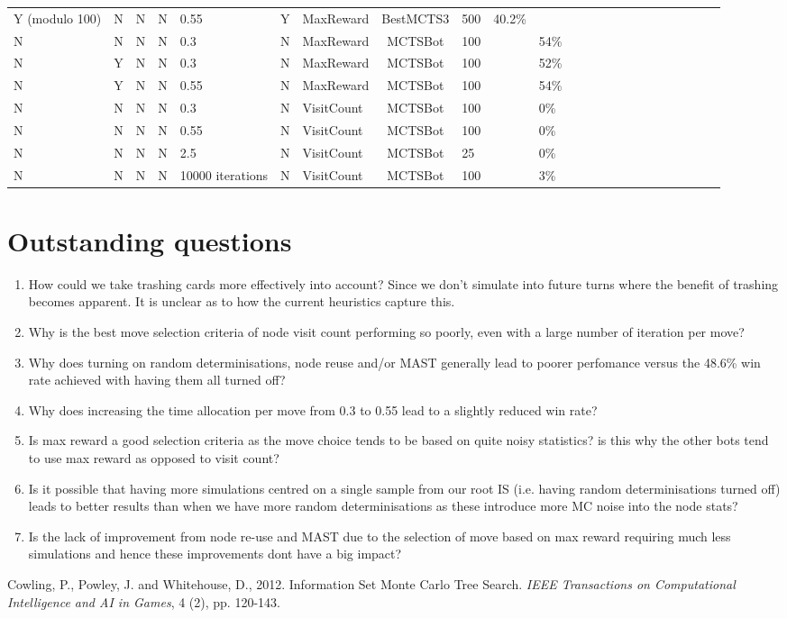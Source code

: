 \documentclass[a4paper,10pt]{article}
\begin{document}
\begin{table}[H]
{\begin{tabular}{lclclclclclclclclclclcl}
Y (modulo 100) & N & N & N & 0.55 & Y & MaxReward & BestMCTS3 & 500 & 40.2\% &  &  \\
N & N & N & N & 0.3 & N & MaxReward & MCTSBot & 100 &  & 54\% &  \\
N & Y & N & N & 0.3 & N & MaxReward & MCTSBot & 100 &  & 52\% &  \\
N & Y & N & N & 0.55 & N & MaxReward & MCTSBot & 100 &  & 54\% &  \\
N & N & N & N & 0.3 & N & VisitCount & MCTSBot & 100 &  & 0\% &  \\
N & N & N & N & 0.55 & N & VisitCount & MCTSBot & 100 &  & 0\% &  \\
N & N & N & N & 2.5 & N & VisitCount & MCTSBot & 25 &  & 0\% &  \\
N & N & N & N & 10000 iterations & N & VisitCount & MCTSBot & 100 &  & 3\% & \\
\hline
\end{tabular}
}
\end{table}

\section{Outstanding questions}
\begin{enumerate}
\item How could we take trashing cards more effectively into account? Since we don't simulate into future turns where the benefit of trashing becomes apparent. It is unclear as to how the current heuristics capture this.
\item Why is the best move selection criteria of node visit count performing so poorly, even with a large number of iteration per move?
\item Why does turning on random determinisations, node reuse and/or MAST generally lead to poorer perfomance versus the 48.6\% win rate achieved with having them all turned off?
\item Why does increasing the time allocation per move from 0.3 to 0.55 lead to a slightly reduced win rate?
\item Is max reward a good selection criteria as the move choice tends to be based on quite noisy statistics? is this why the other bots tend to use max reward as opposed to visit count?
\item Is it possible that having more simulations centred on a single sample from our root IS (i.e. having random determinisations turned off) leads to better results than when we have more random determinisations as these introduce more MC noise into the node stats?
\item Is the lack of improvement from node re-use and MAST due to the selection of move based on max reward requiring much less simulations and hence these improvements dont have a big impact?
\end{enumerate}

\begin{thebibliography}{99}
Cowling, P., Powley, J. and Whitehouse, D., 2012. Information Set Monte Carlo Tree Search. \textit{IEEE Transactions on Computational Intelligence and AI in Games}, 4 (2), pp. 120-143.\\
\\
\end{thebibliography}
\end{document}
